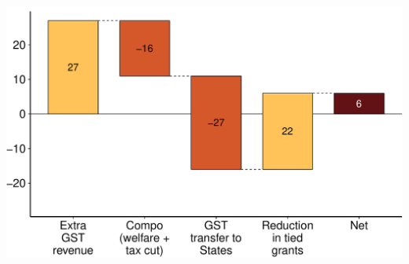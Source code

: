 \documentclass[a4paper,landscape]{article}\usepackage[]{graphicx}\usepackage[]{color}
\newenvironment{knitrout}{}{} %
\begin{document}
\begin{knitrout}
\color{fgcolor}
\includegraphics[width=11.000in,height=7.00in]{figure/GST-Figure-11-1} 


\end{knitrout}
\end{document}

